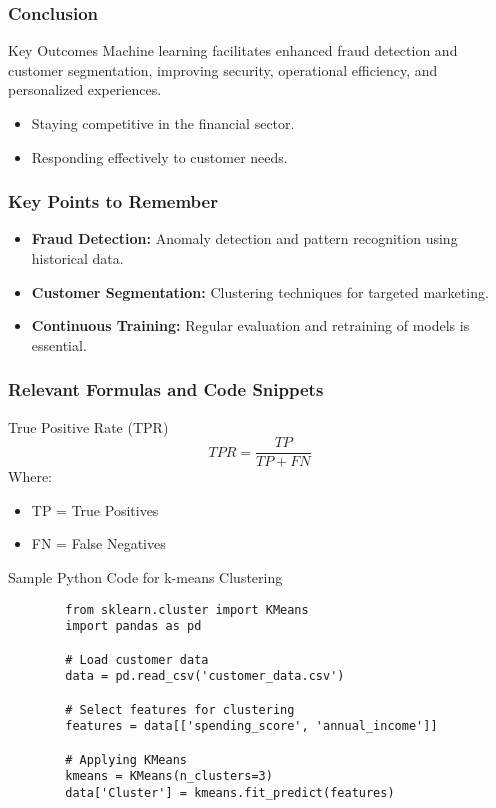 \documentclass{beamer}
\begin{document}
\begin{frame}[fragile]
    \frametitle{Conclusion}
    \begin{block}{Key Outcomes}
        Machine learning facilitates enhanced fraud detection and customer segmentation, improving security, operational efficiency, and personalized experiences.
    \end{block}
    \begin{itemize}
        \item Staying competitive in the financial sector.
        \item Responding effectively to customer needs.
    \end{itemize}
\end{frame}

\begin{frame}[fragile]
    \frametitle{Key Points to Remember}
    \begin{itemize}
        \item \textbf{Fraud Detection:} Anomaly detection and pattern recognition using historical data.
        \item \textbf{Customer Segmentation:} Clustering techniques for targeted marketing.
        \item \textbf{Continuous Training:} Regular evaluation and retraining of models is essential.
    \end{itemize}
\end{frame}

\begin{frame}[fragile]
    \frametitle{Relevant Formulas and Code Snippets}
    \begin{block}{True Positive Rate (TPR)}
        \begin{equation}
            TPR = \frac{TP}{TP + FN}
        \end{equation}
        Where:
        \begin{itemize}
            \item TP = True Positives
            \item FN = False Negatives
        \end{itemize}
    \end{block}
    \begin{block}{Sample Python Code for k-means Clustering}
        \begin{lstlisting}
        from sklearn.cluster import KMeans
        import pandas as pd

        # Load customer data
        data = pd.read_csv('customer_data.csv')

        # Select features for clustering
        features = data[['spending_score', 'annual_income']]

        # Applying KMeans
        kmeans = KMeans(n_clusters=3)
        data['Cluster'] = kmeans.fit_predict(features)
        \end{lstlisting}
    \end{block}
\end{frame}
\end{document}
